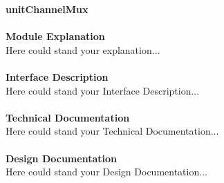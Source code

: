 \documentclass[../../../../doc/ASP-SoC_doc/main.tex]{subfiles}
\begin{document}
\textbf{unitChannelMux}
\\\\
\textbf{Module Explanation}
\\
Here could stand your explanation...\\
\\
\textbf{Interface Description}
\\
Here could stand your Interface Description...\\
\\
\textbf{Technical Documentation}
\\
Here could stand your Technical Documentation...\\
\\
\textbf{Design Documentation}
\\
Here could stand your Design Documentation...\\
\\
\end{document}
